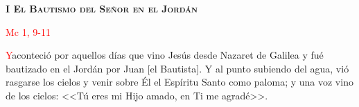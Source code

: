 \begin{center}
    \textbf{\textsc{I El Bautismo del Señor en el Jordán}}
    
    \textcolor{red}{Mc 1, 9-11}
\end{center}

\lettrine[lines=2]{\textcolor{red}{Y}}\space aconteció por aquellos días que vino Jesús desde Nazaret de Galilea y fué bautizado en el Jordán por Juan [el Bautista].
Y al punto subiendo del agua, vió rasgarse los cielos y venir sobre Él el Espíritu Santo como paloma; y una voz vino de los cielos: 
<<Tú eres mi Hijo amado, en Ti me agradé>>.
